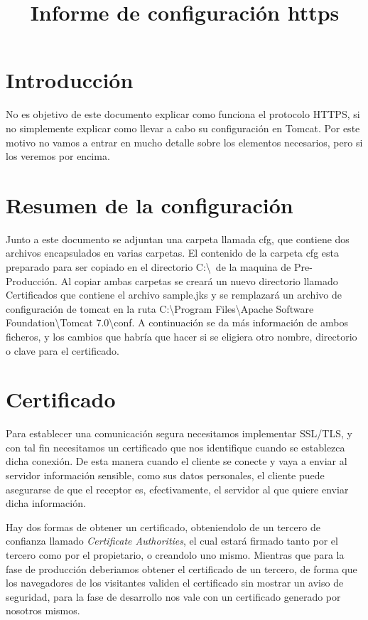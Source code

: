 \documentclass[a4paper]{article}
\title{Informe de configuración https}
\date{}
\begin{document}
\setlength{\voffset}{-5em}
\maketitle

\section{Introducción}

No es objetivo de este documento explicar como funciona el protocolo HTTPS, si no simplemente explicar como llevar a cabo su configuración en Tomcat. Por este motivo no vamos a entrar en mucho detalle sobre los elementos necesarios, pero si los veremos por encima.

\section{Resumen de la configuración}

Junto a este documento se adjuntan una carpeta llamada cfg, que contiene dos archivos encapsulados en varias carpetas. El contenido de la carpeta cfg esta preparado para ser copiado en el directorio C:\textbackslash \ de la maquina de Pre-Producción. Al copiar ambas carpetas se creará un nuevo directorio llamado Certificados que contiene el archivo sample.jks y se remplazará un archivo de configuración de tomcat en la ruta C:\textbackslash Program Files\textbackslash Apache Software Foundation\textbackslash Tomcat 7.0\textbackslash conf. A continuación se da más información de ambos ficheros, y los cambios que habría que hacer si se eligiera otro nombre, directorio o clave para el certificado.

\section{Certificado}

Para establecer una comunicación segura necesitamos implementar SSL/TLS, y con tal fin necesitamos un certificado que nos identifique cuando se establezca dicha conexión. De esta manera cuando el cliente se conecte y vaya a enviar al servidor información sensible, como sus datos personales, el cliente puede asegurarse de que el receptor es, efectivamente, el servidor al que quiere enviar dicha información.

Hay dos formas de obtener un certificado, obteniendolo de un tercero de confianza llamado \textit{Certificate Authorities}, el cual estará firmado tanto por el tercero como por el propietario, o creandolo uno mismo. Mientras que para la fase de producción deberiamos obtener el certificado de un tercero, de forma que los navegadores de los visitantes validen el certificado sin mostrar un aviso de seguridad, para la fase de desarrollo nos vale con un certificado generado por nosotros mismos.
\end{document}
